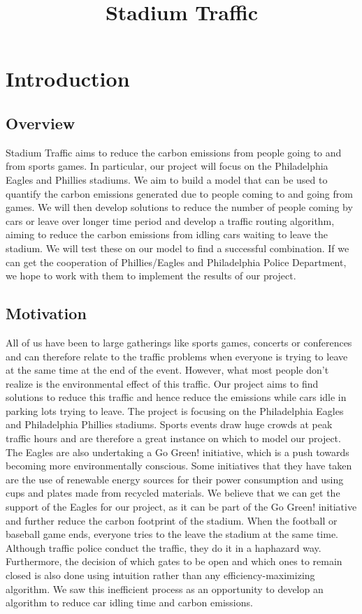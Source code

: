 \documentclass[draft,12pt,titlepage]{article}
\title{Stadium Traffic}
\begin{document}
\maketitle
\frontmatter
\abstract

\newpage

\tableofcontents
\newpage

\mainmatter
\section{Introduction}
\subsection{Overview}
Stadium Traffic aims to reduce the carbon emissions from people going to and from sports
games. In particular, our project will focus on the Philadelphia Eagles and Phillies stadiums.
We aim to build a model that can be used to quantify the carbon emissions generated due to
people coming to and going from games. We will then develop solutions to reduce the
number of people coming by cars or leave over longer time period and develop a traffic
routing algorithm, aiming to reduce the carbon emissions from idling cars waiting to leave
the stadium. We will test these on our model to find a successful combination. If we can get
the cooperation of Phillies/Eagles and Philadelphia Police Department, we hope to work with
them to implement the results of our project.

\subsection{Motivation}
All of us have been to large gatherings like sports games, concerts or conferences and can
therefore relate to the traffic problems when everyone is trying to leave at the same time at
the end of the event. However, what most people don’t realize is the environmental effect of
this traffic. Our project aims to find solutions to reduce this traffic and hence reduce the
emissions while cars idle in parking lots trying to leave.
The project is focusing on the Philadelphia Eagles and Philadelphia Phillies stadiums. Sports
events draw huge crowds at peak traffic hours and are therefore a great instance on which to
model our project. The Eagles are also undertaking a Go Green! initiative, which is a push
towards becoming more environmentally conscious. Some initiatives that they have taken are
the use of renewable energy sources for their power consumption and using cups and plates
made from recycled materials. We believe that we can get the support of the Eagles for our
project, as it can be part of the Go Green! initiative and further reduce the carbon footprint of
the stadium.
When the football or baseball game ends, everyone tries to the leave the stadium at the same
time. Although traffic police conduct the traffic, they do it in a haphazard way. Furthermore,
the decision of which gates to be open and which ones to remain closed is also done using
intuition rather than any efficiency-maximizing algorithm. We saw this inefficient process as
an opportunity to develop an algorithm to reduce car idling time and carbon emissions.
\end{document}
